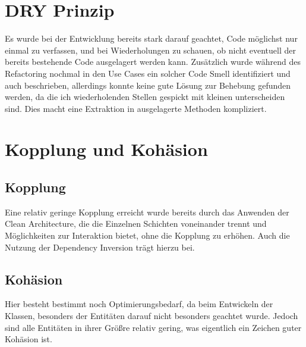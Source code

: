 \section{DRY Prinzip}
Es wurde bei der Entwicklung bereits stark darauf geachtet, Code möglichst nur einmal zu verfassen, und bei Wiederholungen zu schauen, ob nicht eventuell der bereits bestehende Code ausgelagert werden kann. Zusätzlich wurde während des Refactoring nochmal in den Use Cases ein solcher Code Smell identifiziert und auch beschrieben, allerdings konnte keine gute Lösung zur Behebung gefunden werden, da die ich wiederholenden Stellen gespickt mit kleinen unterscheiden sind. Dies macht eine Extraktion in ausgelagerte Methoden kompliziert.
\section{Kopplung und Kohäsion}
\subsection{Kopplung}
Eine relativ geringe Kopplung erreicht wurde bereits durch das Anwenden der Clean Architecture, die die Einzelnen Schichten voneinander trennt und Möglichkeiten zur Interaktion bietet, ohne die Kopplung zu erhöhen. Auch die Nutzung der Dependency Inversion trägt hierzu bei.
\subsection{Kohäsion}
Hier besteht bestimmt noch Optimierungsbedarf, da beim Entwickeln der Klassen, besonders der Entitäten darauf nicht besonders geachtet wurde. Jedoch sind alle Entitäten in ihrer Größre relativ gering, was eigentlich ein Zeichen guter Kohäsion ist. 